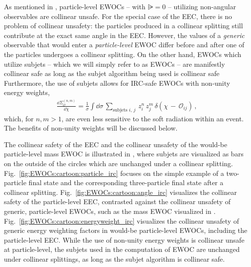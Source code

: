 As mentioned in , particle-level EWOCs -- with \(\rsub = 0\) -- utilizing non-angular observables are collinear unsafe.
%
For the special case of the EEC, there is no problem of collinear unsafety:
%
the particles produced in a collinear splitting still contribute at the exact same angle in the EEC.
%
However, the values of a \emph{generic} observable that would enter a \emph{particle-level} EWOC differ before and after one of the particles undergoes a collinear splitting.
%
On the other hand, EWOCs which utilize subjets -- which we will simply refer to as EWOCs -- are manifestly collinear safe as long as the subjet algorithm being used is collinear safe
%
Furthermore, the use of subjets allows for IRC-safe EWOCs with non-unity energy weights,
\begin{align}
    \label{eq:weights_defn}
    \frac{\dd \Sigma^{(n,m)}_\mathcal{O}}{\dd \chi}
    =
    \frac{1}{\sigma}
    \int \dd\sigma \,
    \sum_{
        \text{subjets }
        i,\, j
    } \,
    z_i^n \, z_j^m \,
    \delta\left(\chi \, - \, \mathcal{O}_{ij}\right)
    \,,
\end{align}
which, for \(n, m > 1\), are even less sensitive to the soft radiation within an event. The benefits of non-unity weights will be discussed below.

The collinear safety of the EEC and the collinear unsafety of the would-be particle-level mass EWOC is illustrated in , where subjets are visualized as bars on the outside of the circles which are unchanged under a collinear splitting.
%
Fig.~\ref{fig:EWOCs:cartoon:particle_irc} focuses on the simple example of a two-particle final state and the corresponding three-particle final state after a collinear splitting.
%
Fig.~\ref{fig:EWOCs:cartoon:angle_irc} visualizes the collinear safety of the particle-level EEC, contrasted against the collinear unsafety of generic, particle-level EWOCs, such as the mass EWOC visualized in .
%
Fig.~\ref{fig:EWOCs:cartoon:energyweight_irc} visualizes the collinear unsafety of generic energy weighting factors in would-be particle-level EWOCs, including the particle-level EEC.
%
While the use of non-unity energy weights is collinear unsafe at particle-level, the subjets used in the computation of EWOC are unchanged under collinear splittings, as long as the subjet algorithm is collinear safe.


